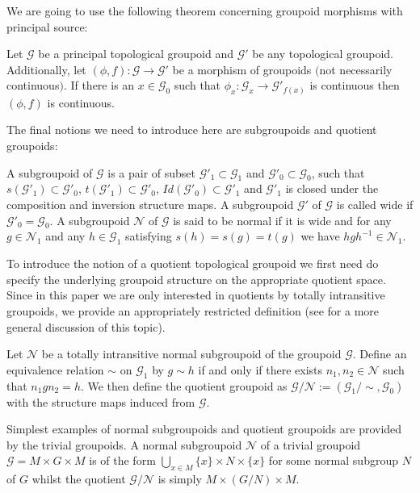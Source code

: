 We are going to use the following theorem concerning groupoid morphisms with principal source:
\begin{tw} \label{AFPG} Let $\mathcal{G}$ be a principal topological groupoid and $\mathcal{G}'$ be any topological groupoid. Additionally, let $(\phi,f)\colon \mathcal{G}\rightarrow\mathcal{G}'$ be a morphism of groupoids $($not necessarily continuous$)$. If there is an $x\in\mathcal{G}_0$ such that $\phi_x\colon \mathcal{G}_x\rightarrow\mathcal{G}'_{f(x)}$ is continuous then $(\phi,f)$ is continuous.
\end{tw}

The final notions we need to introduce here are subgroupoids and quotient groupoids:
\begin{defi} A subgroupoid of $\mathcal{G}$ is a pair of subset $\mathcal{G}'_1\subset\mathcal{G}_1$ and $\mathcal{G}'_0\subset\mathcal{G}_0$, such that $s(\mathcal{G}'_1)\subset\mathcal{G}'_0$, $t(\mathcal{G}'_1)\subset\mathcal{G}'_0$, $Id(\mathcal{G}'_0)\subset\mathcal{G}'_1$ and $\mathcal{G}'_1$ is closed under the composition and inversion structure maps. A subgroupoid $\mathcal{G}'$ of $\mathcal{G}$ is called wide if $\mathcal{G}'_0=\mathcal{G}_0$. A subgroupoid $\mathcal{N}$ of $\mathcal{G}$ is said to be normal if it is wide and for any $g\in\mathcal{N}_1$ and any $h\in\mathcal{G}_1$ satisfying $s(h)=s(g)=t(g)$ we have $hgh^{-1}\in\mathcal{N}_1$.
\end{defi}
To introduce the notion of a quotient topological groupoid we first need do specify the underlying groupoid structure on the appropriate quotient space. Since in this paper we are only interested in quotients by totally intransitive groupoids, we provide an appropriately restricted definition (see \cite{McK1} for a more general discussion of this topic).
\begin{defi} Let $\mathcal{N}$ be a totally intransitive normal subgroupoid of the groupoid $\mathcal{G}$. Define an equivalence relation $\sim$ on $\mathcal{G}_1$ by $g\sim h$ if and only if there exists $n_1,n_2\in\mathcal{N}$ such that $n_1gn_2=h$. We then define the quotient groupoid as $\mathcal{G}\slash\mathcal{N}:=(\mathcal{G}_1\slash\sim,\mathcal{G}_0)$ with the structure maps induced from $\mathcal{G}$.
\end{defi}
\begin{egg} Simplest examples of normal subgroupoids and quotient groupoids are provided by the trivial groupoids. A normal subgroupoid $\mathcal{N}$ of a trivial groupoid $\mathcal{G}=M\times G\times M$ is of the form $\bigcup\limits_{x\in M} \{ x\}\times N\times \{ x\}$ for some normal subgroup $N$ of $G$ whilst the quotient $\mathcal{G}\slash\mathcal{N}$ is simply $M\times (G\slash N)\times M$.
\end{egg}
